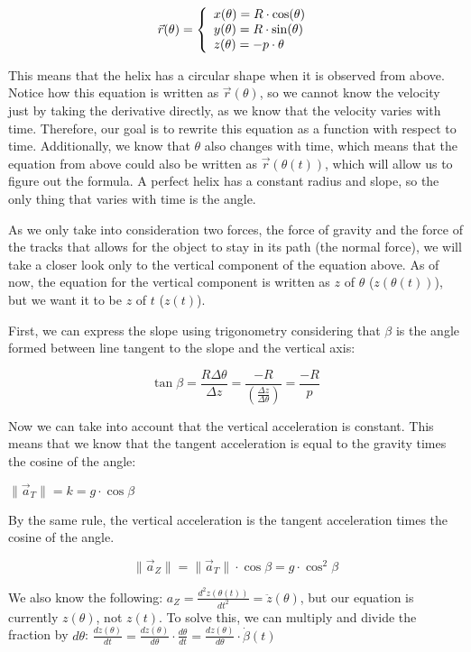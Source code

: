 \documentclass[12pt,twoside,a4paper]{article}
\newcommand{\ds}{\displaystyle}
\begin{document}
	$$\vec{r}(\theta) = \left\{\begin{array}{l} x(\theta) = R \cdot \cos(\theta) \cr y(\theta) = R \cdot \sin(\theta) \cr z(\theta) = -p \cdot \theta \end{array}\right.$$
	
	This means that the helix has a circular shape when it is observed from above. Notice how this equation is written as $\vec{r}(\theta)$, so we cannot know the velocity just by taking the derivative directly, as we know that the velocity varies with time. Therefore, our goal is to rewrite this equation as a function with respect to time. Additionally, we know that $\theta$ also changes with time, which means that the equation from above could also be written as $\vec{r}(\theta(t))$, which will allow us to figure out the formula. A perfect helix has a constant radius and slope, so the only thing that varies with time is the angle.
	
	As we only take into consideration two forces, the force of gravity and the force of the tracks that allows for the object to stay in its path (the normal force), we will take a closer look only to the vertical component of the equation above. As of now, the equation for the vertical component is written as $z$ of $\theta$ ($z(\theta(t))$), but we want it to be $z$ of $t$ ($z(t)$).
	
	First, we can express the slope using trigonometry considering that $\beta$ is the angle formed between line tangent to the slope and the vertical axis:
	
	$$\ds \tan \beta = \frac{R \Delta \theta}{\Delta z} = \frac{-R}{\left(\frac{\Delta z}{\Delta \theta}\right)} = \frac{-R}{p}$$
	
	Now we can take into account that the vertical acceleration is constant. This means that we know that the tangent acceleration is equal to the gravity times the cosine of the angle:
	
	$\|\vec{a}_T\| = k = g \cdot \cos{\beta}$
	
	By the same rule, the vertical acceleration is the tangent acceleration times the cosine of the angle.
	
	$$\|\vec{a}_Z\| = \|\vec{a}_T\| \cdot \cos{\beta} = g \cdot \cos^2{\beta}$$
	
	We also know the following: $\ds a_Z = \frac{d^2 z(\theta(t))}{dt^2} = \ddot z (\theta)$, but our equation is currently $z(\theta)$, not $z(t)$. To solve this, we can multiply and divide the fraction by $d\theta$: $\ds \frac{dz(\theta)}{dt} = \frac{dz(\theta)}{d\theta} \cdot \frac{d\theta}{dt} = \frac{dz(\theta)}{d\theta} \cdot \dot\beta(t)$
	
\end{document}
